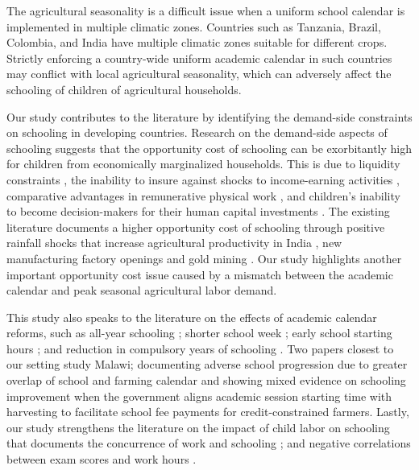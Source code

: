 \documentclass[12pt,letterpaper]{article}
\newcommand{\0}{\ensuremath{\mbox{\boldmath $0$}}}
\begin{document}
The agricultural seasonality is a difficult issue when a uniform school calendar is implemented in multiple climatic zones. Countries such as Tanzania, Brazil, Colombia, and India have multiple climatic zones suitable for different crops. Strictly enforcing a country-wide uniform academic calendar in such countries may conflict with local agricultural seasonality, which can adversely affect the schooling of children of agricultural households. 

Our study contributes to the literature by identifying the demand-side constraints on schooling in developing countries. Research on the demand-side aspects of schooling suggests that the opportunity cost of schooling can be exorbitantly high for children from economically marginalized households. This is due to liquidity constraints  \citep{JacobySkoufias1997, BeegleDehejiaGatti2006}, the inability to insure against shocks to income-earning activities \citep{Jensen2000, deJanvryetal2006, Case2006}, comparative advantages in remunerative physical work \citep{PittRosenzweigHassan2010}, and children's inability to become decision-makers for their human capital investments \citep{BalandRobinson2000}. The existing literature documents a higher opportunity cost of schooling through positive rainfall shocks that increase agricultural productivity in India \citep{shah2017drought}, new manufacturing factory openings \citep{atkin2016endogenous} and gold mining \citep{santos2018blessing}. Our study highlights another important opportunity cost issue caused by a mismatch between the academic calendar and peak seasonal agricultural labor demand.

This study also speaks to the literature on the effects of academic calendar reforms, such as all-year schooling \citep{ mcmullen2012impact, graves2010academic}; shorter school week \citep{anderson2015does}; early school starting hours \citep{cortes2012role,  hinrichs2011bell, edwards2012early, carrell2011s}; and reduction in compulsory years of schooling \citep{elsayed2021less}. Two papers closest to our setting study Malawi; \cite{allen2024double} documenting adverse school progression due to greater overlap of school and farming calendar and \cite{dillon2021selling} showing mixed evidence on schooling improvement when the government aligns academic session starting time with harvesting to facilitate school fee payments for credit-constrained farmers. Lastly, our study strengthens the literature on the impact of child labor on schooling that documents the concurrence of work and schooling \citep{RavallionWodon2000, Edmonds2007, Dumas2012}; and negative correlations between exam scores and work hours \citep{AkabayashiPsacharopoulos1999, Heady2003, Gunnarsson2006}.
\end{document}
